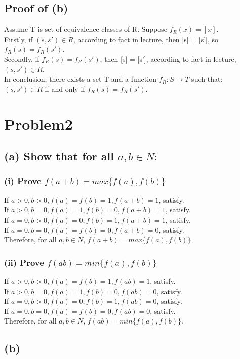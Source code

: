 \documentclass[]{article}
\begin{document}
\begin{spacing}{1.5}
		\subsection*{Proof of (b)}
		Assume T is set of equivalence classes of R. Suppose $ f_R(x) = [x] $.\\
		Firstly, if $ (s, s') \in R $, according to fact in lecture, then [s] = [s'], so $ f_R(s) = f_R(s') $.\\
		Secondly, if $ f_R(s) = f_R(s') $, then  [s] = [s'], according to fact in lecture, $ (s, s') \in R $.\\
		In conclusion, there exists a set T and a function $ f_R : S \rightarrow T $ such that: $ (s, s') \in R $ if and only if $ f_R(s) = f_R(s') $.
		
		
		\section*{Problem2}
		\subsection*{(a) Show that for all $ a,b \in N: $}
		\subsubsection*{(i) Prove $ f(a+b) = max\{f(a),f(b)\} $}
		If $ a>0,b>0,f(a)=f(b)=1,f(a+b)=1 $, satisfy.\\
		If $ a>0,b=0,f(a)=1,f(b)=0,f(a+b)=1$, satisfy.\\
		If $ a=0,b>0,f(a)=0,f(b)=1,f(a+b)=1 $, satisfy.\\
		If $ a=0,b=0,f(a)=f(b)=0,f(a+b)=0 $, satisfy.\\
		Therefore, for all $ a,b \in N$, $ f(a+b) = max\{f(a),f(b)\} $.
		\subsubsection*{(ii) Prove $ f(ab) = min\{f(a),f(b)\} $}
		If $ a>0,b>0,f(a)=f(b)=1,f(ab)=1 $, satisfy.\\
		If $ a>0,b=0,f(a)=1,f(b)=0,f(ab)=0$, satisfy.\\
		If $ a=0,b>0,f(a)=0,f(b)=1,f(ab)=0 $, satisfy.\\
		If $ a=0,b=0,f(a)=f(b)=0,f(ab)=0 $, satisfy.\\
		Therefore, for all $ a,b \in N$, $ f(ab) = min\{f(a),f(b)\} $.
		\subsection*{(b)}

\end{spacing}
\end{document}
